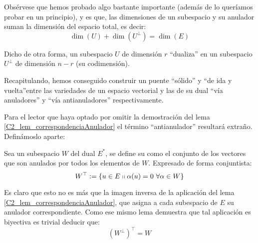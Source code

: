 \begin{obs}
	\label{C2_obs_dim_anulador}
	Obsérvese que hemos probado algo bastante importante (además de lo queríamos probar en un principio), y es que, las dimensiones de un subespacio y su anulador suman la dimensión del espacio total, es decir:
	\begin{equation}\label{C2_eq_dim_anulador}
	\dim(U)+\dim(U^{\perp})=\dim(E)
	\end{equation}
	
	Dicho de otra forma, un subespacio $U$ de dimensión $r$ ``dualiza'' en un subespacio $U^\perp$ de dimensión $n-r$ (su codimensión).
\end{obs}

Recapitulando, hemos conseguido construir un puente ``sólido'' y ``de ida y vuelta''entre las variedades de un espacio vectorial y las de su dual ``vía anuladores'' y ``vía antianuladores'' respectivamente.

Para el lector que haya optado por omitir la demostración del lema \ref{C2_lem_correspondenciaAnulador} el término ``antianulador'' resultará extraño. Definámoslo aparte:
\begin{defi}[Antianulador]
	Sea un subespacio $W$ del dual $E^*$, se define su  como el conjunto de los vectores que son anulados por todos los elementos de $W$. Expresado de forma conjuntista:
	\[W^\top:=\{u\in E\shortparallel \alpha(u)=0\ \forall\alpha\in W\}\]
\end{defi}

Es claro que esto no es más que la imagen inversa de la aplicación del lema \ref{C2_lem_correspondenciaAnulador}, que asigna a cada subespacio de $E$ su anulador correspondiente. Como ese mismo lema demuestra que tal aplicación es biyectiva es trivial deducir que:
\begin{equation}
	\label{C2_eq_involutividad}
	(W^{\perp})^{\top}=W
\end{equation}


